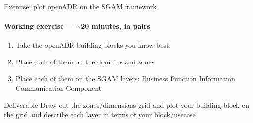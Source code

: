 \begin{frame}{Exercise: plot openADR on the SGAM framework}
  \framesubtitle{Working exercise — \textasciitilde{}20 minutes, in pairs}

  \begin{enumerate}
    \item Take the openADR building blocks you know best:
    \item Place each of them on the domains and zones  
    \item Place each of them on the SGAM layers:
      \alert{Business \textbar{} Function \textbar{} Information \textbar{} Communication \textbar{} Component}
  \end{enumerate}

  \vspace{0.3cm}
  \begin{block}{Deliverable}
    Draw out the zones/dimensions grid and plot your building block on the grid and describe each layer in terms of your block/usecase
  \end{block}
\end{frame}
